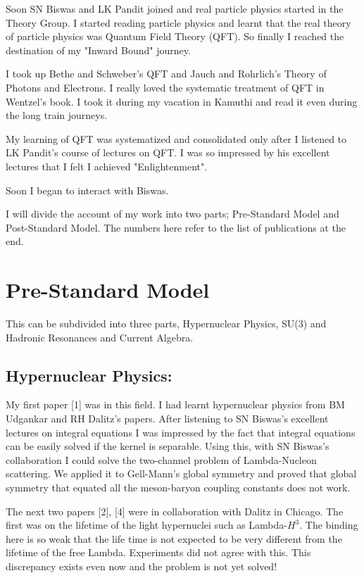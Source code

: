 Soon SN Biswas and LK Pandit joined and real particle physics started in 
the Theory Group. I started reading particle physics and learnt that the 
real theory of particle physics was Quantum Field Theory (QFT). So 
finally I reached the destination of my "Inward Bound" journey.
\smallskip

I took up Bethe and Schweber's QFT and Jauch and Rohrlich's Theory of 
Photons and Electrons. I really loved the systematic treatment of QFT in 
Wentzel's book. I took it during my vacation in Kamuthi and read it even 
during the long train journeys.
\smallskip

My learning of QFT was systematized and consolidated only after I 
listened to LK Pandit's course of lectures on QFT. I was so impressed by 
his excellent lectures that I felt I achieved "Enlightenment".
\smallskip

Soon I began to interact with Biswas.
\smallskip

I will divide the account of my work into two parts; Pre-Standard Model 
and Post-Standard Model. The numbers here refer to the list of 
publications at the end.

\section*{Pre-Standard Model}

This can be subdivided into three parts, Hypernuclear Physics, 
SU(3) and Hadronic Resonances and Current Algebra.

\subsection*{Hypernuclear Physics: }

My first paper [1] was in this field. I had learnt hypernuclear physics 
from BM Udgankar and RH Dalitz's papers. After listening to SN Biswas's 
excellent lectures on integral equations I was impressed by the fact 
that integral equations can be easily solved if the kernel is separable. 
Using this, with SN Biswas's collaboration I could solve the two-channel 
problem of Lambda-Nucleon scattering. We applied it to Gell-Mann's 
global symmetry and proved that global symmetry that equated all the 
meson-baryon coupling constants does not work.

The next two papers [2], [4] were in collaboration with Dalitz in Chicago. 
The first was on the lifetime of the light hypernuclei such as 
Lambda-$H^3$. The binding here is so weak that the life time is not 
expected to be very different from the lifetime of the free Lambda. 
Experiments did not agree with this. This discrepancy exists even now 
and the problem is not yet solved!

